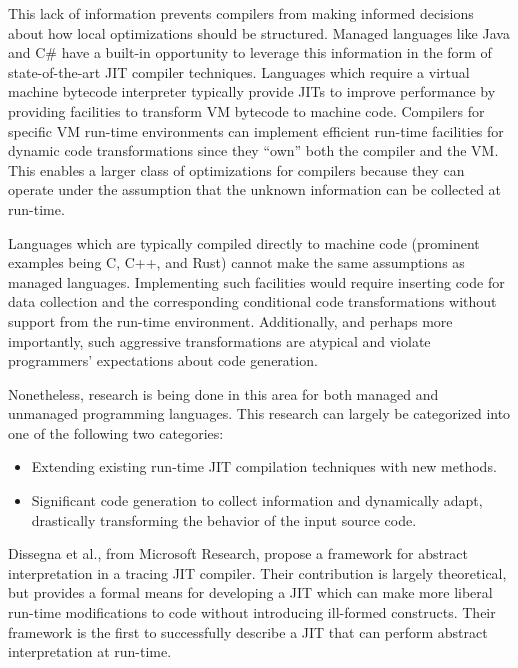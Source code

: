 \documentclass[nobib]{tufte-handout}
\makeatletter
\renewcommand{\subsubsection}{\ttl@straightclass{subsubsection}}
\newcommand{\csharp}{C\# }
\makeatother
\begin{document}
This lack of information prevents compilers from making informed decisions about how local optimizations should be structured.  Managed languages like Java and \csharp have a built-in opportunity to leverage this information in the form of state-of-the-art JIT compiler techniques.  Languages which require a virtual machine bytecode interpreter typically provide JITs to improve performance by providing facilities to transform VM bytecode to machine code.  Compilers for specific VM run-time environments can implement efficient run-time facilities for dynamic code transformations since they ``own'' both the compiler and the VM.  This enables a larger class of optimizations for compilers because they can operate under the assumption that the unknown information can be collected at run-time.

Languages which are typically compiled directly to machine code (prominent examples being C, C++, and Rust) cannot make the same assumptions as managed languages.  Implementing such facilities would require inserting code for data collection and the corresponding conditional code transformations without support from the run-time environment.  Additionally, and perhaps more importantly, such aggressive transformations are atypical and violate programmers' expectations about code generation.  

Nonetheless, research is being done in this area for both managed and unmanaged programming languages.  This research can largely be categorized into one of the following two categories:
\begin{itemize}
\item Extending existing run-time JIT compilation techniques with new methods.
\item Significant code generation to collect information and dynamically adapt, drastically transforming the behavior of the input source code.
\end{itemize}

\subsubsection{Innovations in JIT Compilers}
Dissegna et al., from Microsoft Research, propose a framework for abstract interpretation in a tracing JIT compiler\cite{Dissegna}.  Their contribution is largely theoretical, but provides a formal means for developing a JIT which can make more liberal run-time modifications to code without introducing ill-formed constructs.  Their framework is the first to successfully describe a JIT that can perform abstract interpretation at run-time.  
\end{document}
